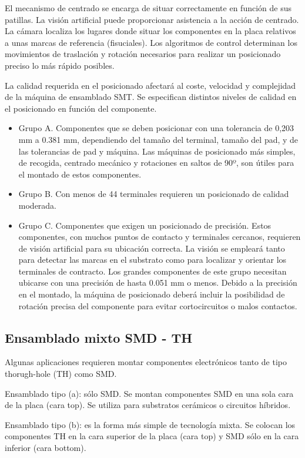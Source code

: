 El mecanismo de centrado se encarga de situar correctamente en función de sus patillas. La visión artificial puede proporcionar asistencia a la acción de centrado. La cámara localiza los lugares donde situar los componentes en la placa relativos a unas marcas de referencia (fisuciales). Los algoritmos de control determinan los movimientos de traslación y rotación necesarios para realizar un posicionado preciso lo más rápido posibles.

La calidad requerida en el posicionado afectará al coste, velocidad y complejidad de la máquina de ensamblado SMT. Se especifican distintos niveles de calidad en el posicionado en función del componente.

\begin{itemize}
    \item Grupo A. Componentes que se deben posicionar con una tolerancia de 0,203 mm a 0.381 mm, dependiendo del tamaño del terminal, tamaño del pad, y de las tolerancias de pad y máquina. Las máquinas de posicionado más simples, de recogida, centrado mecánico y rotaciones en saltos de 90º, son útiles para el montado de estos componentes.
    \item Grupo B. Con menos de 44 terminales requieren un posicionado de calidad moderada.
    \item Grupo C. Componentes que exigen un posicionado de precisión. Estos componentes, con muchos puntos de contacto y terminales cercanos, requieren de visión artificial para su ubicación correcta. La visión se empleará tanto para detectar las marcas en el substrato como para localizar y orientar los terminales de contracto. Los grandes componentes de este grupo necesitan ubicarse con una precisión de hasta 0.051 mm o menos. Debido a la precisión en el montado, la máquina de posicionado deberá incluir la posibilidad de rotación precisa del componente para evitar cortocircuitos o malos contactos.
\end{itemize}

\subsection{Ensamblado mixto SMD - TH}
Algunas aplicaciones requieren montar componentes electrónicos tanto de tipo thorugh-hole (TH) como SMD.

Ensamblado tipo (a): sólo SMD. Se montan componentes SMD en una sola cara de la placa (cara top). Se utiliza para substratos cerámicos o circuitos híbridos.

Ensamblado tipo (b): es la forma más simple de tecnología mixta. Se colocan los componentes TH en la cara superior de la placa (cara top) y SMD sólo en la cara inferior (cara bottom).

